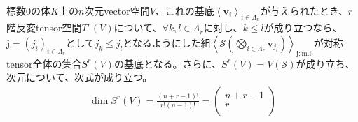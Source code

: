\documentclass[dvipdfmx]{jsarticle}
\begin{document}
\begin{thm}\label{2.4.8.14}
標数$0$の体$K$上の$n$次元vector空間$V$、これの基底$\left\langle \mathbf{v}_{i} \right\rangle_{i \in \varLambda_{n}}$が与えられたとき、$r$階反変tensor空間$T^{r}(V)$について、$\forall k,l \in \varLambda_{r}$に対し、$k \leq l$が成り立つなら、$\mathbf{j}=\left( j_{i} \right)_{i \in \varLambda_{r}}$として$j_{k} \leq j_{l}$となるようにした組$\left\langle \mathcal{S}\left( \bigotimes_{i \in \varLambda_{r}} \mathbf{v}_{j_{i}} \right) \right\rangle_{\mathbf{j}:\mathrm{m.i.} }$が対称tensor全体の集合$S^{r}(V)$の基底となる。さらに、$S^{r}(V) = V\left( \mathcal{S} \right)$が成り立ち、次元について、次式が成り立つ。
\begin{align*}
\dim{S^{r}(V)} = \frac{(n + r - 1)!}{r!(n - 1)!} = \begin{pmatrix}
n + r - 1 \\
r \\
\end{pmatrix}
\end{align*}
\end{thm}
\end{document}
